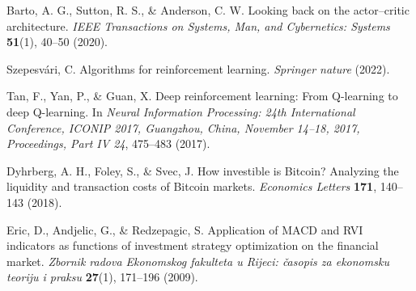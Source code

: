 \documentclass[12pt]{article}
\begin{document}
\begin{thebibliography}{11}  
\small


Barto, A. G., Sutton, R. S., \& Anderson, C. W. Looking back on the actor--critic architecture. \textit{IEEE Transactions on Systems, Man, and Cybernetics: Systems} \textbf{51}(1), 40--50 (2020).  

Szepesvári, C. Algorithms for reinforcement learning. \textit{Springer nature} (2022).
 

Tan, F., Yan, P., \& Guan, X. Deep reinforcement learning: From Q-learning to deep Q-learning. In \textit{Neural Information Processing: 24th International Conference, ICONIP 2017, Guangzhou, China, November 14--18, 2017, Proceedings, Part IV 24}, 475--483 (2017).

Dyhrberg, A. H., Foley, S., \& Svec, J. How investible is Bitcoin? Analyzing the liquidity and transaction costs of Bitcoin markets. \textit{Economics Letters} \textbf{171}, 140--143 (2018).

Eric, D., Andjelic, G., \& Redzepagic, S. Application of MACD and RVI indicators as functions of investment strategy optimization on the financial market. \textit{Zbornik radova Ekonomskog fakulteta u Rijeci: časopis za ekonomsku teoriju i praksu} \textbf{27}(1), 171--196 (2009).

\end{thebibliography}   
\end{document}
